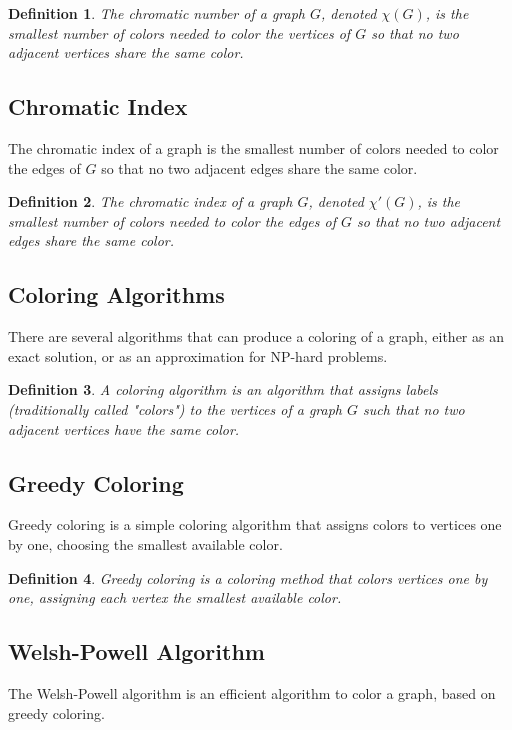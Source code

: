 \documentclass{article}
\newtheorem{definition}{Definition}
\begin{document}
\begin{definition}
	The \textit{chromatic number} of a graph \(G\), denoted \(\chi(G)\), is the smallest number of colors needed to color the vertices of \(G\) so that no two adjacent vertices share the same color.
\end{definition}

\subsection{Chromatic Index}
The chromatic index of a graph is the smallest number of colors needed to color the edges of \(G\) so that no two adjacent edges share the same color.

\begin{definition}
	The \textit{chromatic index} of a graph \(G\), denoted \(\chi'(G)\), is the smallest number of colors needed to color the edges of \(G\) so that no two adjacent edges share the same color.
\end{definition}

\subsection{Coloring Algorithms}
There are several algorithms that can produce a coloring of a graph, either as an exact solution, or as an approximation for NP-hard problems.

\begin{definition}
	A \textit{coloring algorithm} is an algorithm that assigns labels (traditionally called "colors") to the vertices of a graph \(G\) such that no two adjacent vertices have the same color.
\end{definition}

\subsection{Greedy Coloring}
Greedy coloring is a simple coloring algorithm that assigns colors to vertices one by one, choosing the smallest available color.

\begin{definition}
	\textit{Greedy coloring} is a coloring method that colors vertices one by one, assigning each vertex the smallest available color.
\end{definition}

\subsection{Welsh-Powell Algorithm}
The Welsh-Powell algorithm is an efficient algorithm to color a graph, based on greedy coloring.
\end{document}
